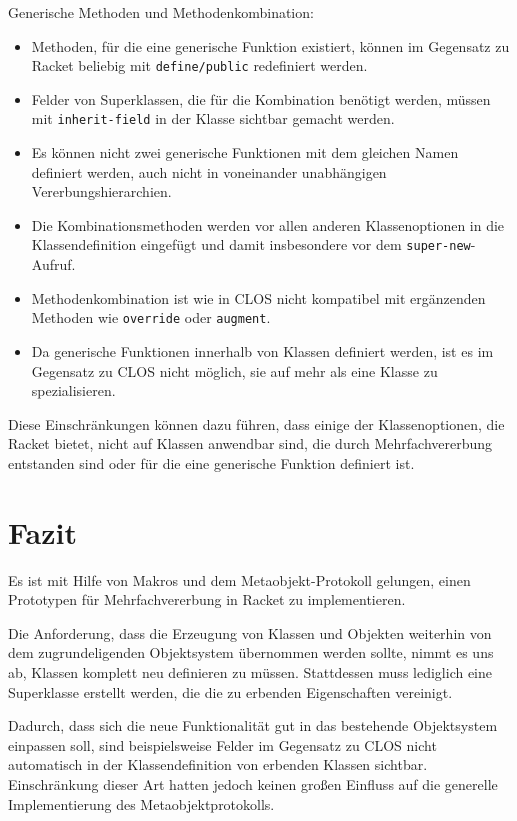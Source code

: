Generische Methoden und Methodenkombination:
\begin{itemize}
 \item Methoden, für die eine generische Funktion existiert, können im Gegensatz zu Racket beliebig mit \texttt{define/public} redefiniert werden.
 \item Felder von Superklassen, die für die Kombination benötigt werden, müssen mit \texttt{inherit-field} in der Klasse sichtbar gemacht werden.
 \item Es können nicht zwei generische Funktionen mit dem gleichen Namen definiert werden, auch nicht in voneinander unabhängigen Vererbungshierarchien.
 \item Die Kombinationsmethoden werden vor allen anderen Klassenoptionen in die Klassendefinition eingefügt und damit insbesondere vor dem \texttt{super-new}-Aufruf.
 \item Methodenkombination ist wie in CLOS nicht kompatibel mit ergänzenden Methoden wie \texttt{override} oder \texttt{augment}.
 \item Da generische Funktionen innerhalb von Klassen definiert werden, ist es im Gegensatz zu CLOS nicht möglich, sie auf mehr als eine Klasse zu spezialisieren.
\end{itemize}

Diese Einschränkungen können dazu führen, dass einige der Klassenoptionen, die Racket bietet, nicht auf Klassen anwendbar sind, die durch Mehrfachvererbung entstanden sind oder für die eine generische Funktion definiert ist.

\section{Fazit}
Es ist mit Hilfe von Makros und dem Metaobjekt-Protokoll gelungen, einen Prototypen für Mehrfachvererbung in Racket zu implementieren.

Die Anforderung, dass die Erzeugung von Klassen und Objekten weiterhin von dem zugrundeligenden Objektsystem übernommen werden sollte, nimmt es uns ab, Klassen komplett neu definieren zu müssen. Stattdessen muss lediglich eine Superklasse erstellt werden, die die zu erbenden Eigenschaften vereinigt. 

Dadurch, dass sich die neue Funktionalität gut in das bestehende Objektsystem einpassen soll, sind beispielsweise Felder im Gegensatz zu CLOS nicht automatisch in der Klassendefinition von erbenden Klassen sichtbar. Einschränkung dieser Art hatten jedoch keinen großen Einfluss auf die generelle Implementierung des Metaobjektprotokolls.

